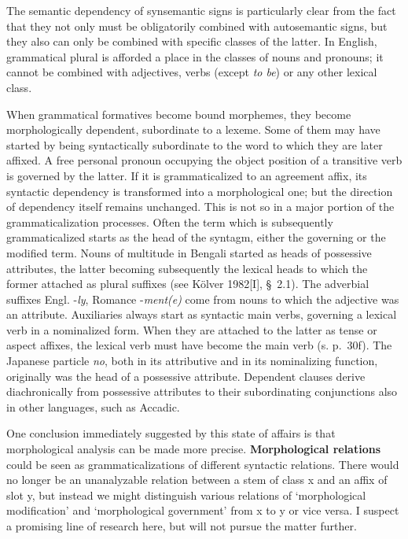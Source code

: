 The semantic dependency of synsemantic signs is particularly clear from the fact that they not only must be obligatorily combined with autosemantic signs, but they also can only be combined with specific classes of the latter. In English, grammatical plural is afforded a place in the classes of nouns and pronouns; it cannot be combined with adjectives, verbs (except \textit{to be}) or any other lexical class.

When grammatical formatives become bound morphemes, they become morphologically dependent, subordinate to a lexeme. Some of them may have started by being syntactically subordinate to the word to which they are later affixed. A free personal pronoun occupying the object position of a transitive verb is governed by the latter. If it is grammaticalized to an agreement affix, its syntactic dependency is transformed into a morphological one; but the direction of dependency itself remains unchanged. This is not so in a major portion of the grammaticalization processes. Often the term which is subsequently grammaticalized starts as the head of the syntagm, either the governing or the modified term. Nouns of multitude in Bengali started as heads of possessive attributes, the latter becoming subsequently the lexical heads to which the former attached as plural suffixes (see Kölver 1982[I], §~2.1). The adverbial suffixes Engl. -\textit{ly}, Romance -\textit{ment(e)} come from nouns to which the adjective was an attribute. Auxiliaries always start as syntactic main verbs, governing a lexical verb in a nominalized form. When they are attached to the latter as tense or aspect affixes, the lexical verb must have become the main verb (s. p.~30f). The Japanese particle \textit{no}, both in its attributive and in its nominalizing function, originally was the head of a possessive attribute. Dependent clauses derive diachronically from possessive attributes to their subordinating conjunctions also in other languages, such as Accadic.

One conclusion immediately suggested by this state of affairs is that morphological analysis can be made more precise. \textbf{Morphological relations} could be seen as grammaticalizations of different syntactic relations. There would no longer be an unanalyzable relation between a stem of class x and an affix of slot y, but instead we might distinguish various relations of ‘morphological modification’ and ‘morphological government’ from x to y or vice versa. I suspect a promising line of research here, but will not pursue the matter further.

